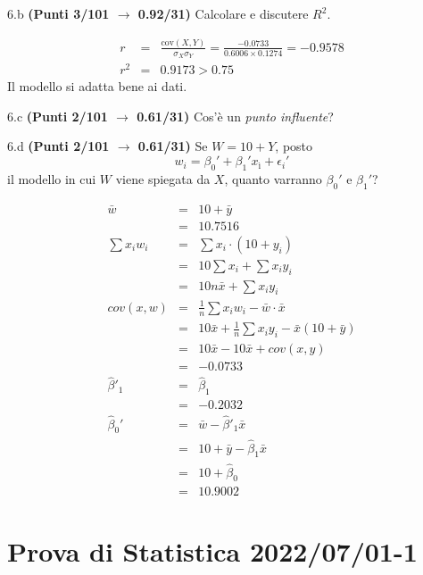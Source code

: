 \documentclass[
  11pt,
]{book}
\theoremstyle{mytheoremstyle}
\theoremstyle{mydefstyle}
\newenvironment{sol}
  {
  \begin{tcolorbox}[enhanced,breakable,arc=0.1mm,boxrule=1pt,colback=white,colframe=iblue,
  title=\bf \fontfamily{lmss}\selectfont \hspace{.5 cm} Soluzione,drop fuzzy shadow]

}{
\end{tcolorbox}
  }
\begin{document}
6.b \textbf{(Punti 3/101 \(\rightarrow\) 0.92/31)} Calcolare e discutere \(R^2\).

\begin{sol}
\begin{eqnarray*}
r&=&\frac{\text{cov}(X,Y)}{\sigma_X\sigma_Y}=\frac{ -0.0733 }{ 0.6006 \times 0.1274 }= -0.9578 \\r^2&=& 0.9173 > 0.75
\end{eqnarray*}
Il modello si adatta bene ai dati.

\end{sol}

6.c \textbf{(Punti 2/101 \(\rightarrow\) 0.61/31)} Cos'è un \emph{punto influente}?

6.d \textbf{(Punti 2/101 \(\rightarrow\) 0.61/31)} Se \(W=10+ Y\), posto
\[w_i=\beta_0'+\beta_1'x_ì +\epsilon_i'\]
il modello in cui \(W\) viene spiegata da \(X\),
quanto varranno \(\beta_0'\) e \(\beta_1'\)?

\begin{sol}
\begin{eqnarray*}
  \bar w &=& 10+ \bar y\\
  &=& 10.7516\\
  \sum x_iw_i&=&\sum x_i\cdot (10+y_i)\\
  &=& 10\sum x_i +\sum x_i y_i\\
  &=& 10n\bar x +\sum x_i y_i\\
  cov(x,w)&=&\frac 1n\sum x_iw_i-\bar w\cdot\bar x\\
  &=&10\bar x +\frac 1n\sum x_i y_i-\bar x(10+\bar y)\\
  &=&10 \bar x - 10 \bar x +cov(x,y) \\
  &=& -0.0733\\
  \hat\beta'_1&=&\hat\beta_1\\
  &=&-0.2032\\
  \hat\beta_0'&=& \bar w -\hat\beta'_1\bar x\\
  &=& 10+\bar y-\hat\beta_1\bar x\\
  &=&10+\hat\beta_0\\
  &=&10.9002
\end{eqnarray*}

\end{sol}

\section{Prova di Statistica 2022/07/01-1}\label{prova-di-statistica-20220701-1}
\end{document}
